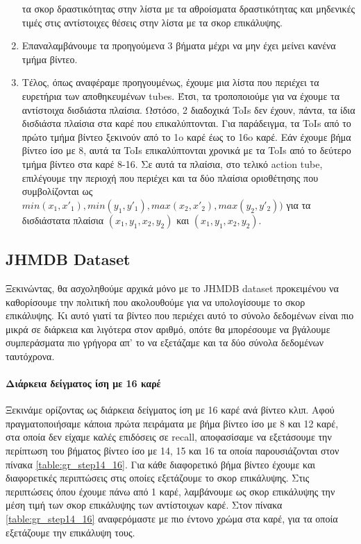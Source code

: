 \begin{enumerate}
  τα σκορ δραστικότητας στην λίστα με τα αθροίσματα δραστικότητας και μηδενικές τιμές στις αντίστοιχες θέσεις στην λίστα
  με τα σκορ επικάλυψης.
\item Επαναλαμβάνουμε τα προηγούμενα 3 βήματα μέχρι να μην έχει μείνει κανένα τμήμα βίντεο.
\item Τέλος, όπως αναφέραμε προηγουμένως, έχουμε μια λίστα που περιέχει τα ευρετήρια των αποθηκευμένων \en tubes\gr. Έτσι,
  τα τροποποιούμε  για να έχουμε  τα αντίστοιχα δισδιάστα πλαίσια. Ωστόσο, 2 διαδοχικά \en ToIs \gr δεν έχουν, πάντα,
  τα ίδια δισδιάστα πλαίσια  στα καρέ  που επικαλύπτονται. Για παράδειγμα, τα \en ToIs \gr από το πρώτο τμήμα βίντεο  ξεκινούν
  από το 1o καρέ έως το 16o καρέ. Εάν  έχουμε βήμα βίντεο ίσο με 8, αυτά τα \en ToIs \gr επικαλύπτονται χρονικά με  τα \en ToIs \gr
  από το δεύτερο τμήμα βίντεο στα καρέ 8-16. Σε αυτά τα πλαίσια, στο τελικό \en action tube\gr,
  επιλέγουμε την περιοχή που περιέχει και τα δύο πλαίσια οριοθέτησης που συμβολίζονται 
  ως $min(x_1,x'_1), min(y_1,y'_1), max(x_2,x'_2), max(y_2,y'_2))$ για τα δισδιάστατα πλαίσια $(x_1,y_1,x_2,y_2)$ και $(x_1,y_1,x_2,y_2)$.
\end{enumerate}

\subsection{\en JHMDB Dataset\gr}
Ξεκινώντας, θα ασχοληθούμε αρχικά μόνο με το \en JHMDB dataset  \gr προκειμένου να καθορίσουμε την πολιτική που ακολουθούμε για να υπολογίσουμε
το σκορ επικάλυψης. Kι αυτό γιατί τα βίντεο που περιέχει αυτό το σύνολο δεδομένων είναι πιο μικρά σε διάρκεια και λιγότερα στον αριθμό, οπότε
θα μπορέσουμε να βγάλουμε συμπεράσματα πιο γρήγορα απ' το να εξετάζαμε και τα δύο σύνολα δεδομένων ταυτόχρονα.

\paragraph{\gr Διάρκεια δείγματος ίση με  16 καρέ}
Ξεκινάμε ορίζοντας ως διάρκεια δείγματος ίση με 16 καρέ ανά βίντεο κλιπ. Αφού πραγματοποιήσαμε κάποια πρώτα πειράματα με βήμα βίντεο
ίσο με 8 και 12 καρέ, στα οποία δεν είχαμε καλές επιδόσεις σε \en recall\gr, αποφασίσαμε να εξετάσουμε την περίπτωση
του βήματος βίντεο ίσο με 14, 15 και 16 τα οποία παρουσιάζονται στον πίνακα \ref{table:gr_step14_16}. Για κάθε διαφορετικό βήμα βίντεο
έχουμε και διαφορετικές περιπτώσεις στις οποίες εξετάζουμε το σκορ επικάλυψης. Στις περιπτώσεις όπου έχουμε πάνω από 1 καρέ, λαμβάνουμε ως
σκορ επικάλυψης την μέση τιμή των σκορ επικάλυψης των αντίστοιχων καρέ. Στον πίνακα \ref{table:gr_step14_16} αναφερόμαστε με πιο έντονο χρώμα στα καρέ, για τα οποία εξετάζουμε
την επικάλυψη τους.

